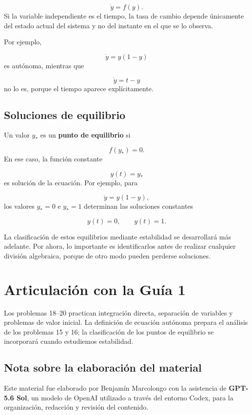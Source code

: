 \documentclass[12pt,a4paper]{article}
\begin{document}
	\[
	\dot y=f(y).
	\]
	Si la variable independiente es el tiempo, la tasa de cambio depende únicamente del estado actual del sistema y no del instante en el que se lo observa.

	Por ejemplo,

	\[
	\dot y=y(1-y)
	\]
	es autónoma, mientras que

	\[
	\dot y=t-y
	\]
	no lo es, porque el tiempo aparece explícitamente.

	\subsection{Soluciones de equilibrio}

	Un valor \(y_\ast\) es un \textbf{punto de equilibrio} si

	\[
	f(y_\ast)=0.
	\]
	En ese caso, la función constante

	\[
	y(t)=y_\ast
	\]
	es solución de la ecuación. Por ejemplo, para

	\[
	\dot y=y(1-y),
	\]
	los valores \(y_\ast=0\) e \(y_\ast=1\) determinan las soluciones constantes

	\[
	y(t)=0,
	\qquad
	y(t)=1.
	\]

	La clasificación de estos equilibrios mediante estabilidad se desarrollará más adelante. Por ahora, lo importante es identificarlos antes de realizar cualquier división algebraica, porque de otro modo pueden perderse soluciones.

	\clearpage
	\section*{Articulación con la Guía 1}

	Los problemas 18--20 practican integración directa, separación de variables y problemas de valor inicial. La definición de ecuación autónoma prepara el análisis de los problemas 15 y 16; la clasificación de los puntos de equilibrio se incorporará cuando estudiemos estabilidad.

	\subsection*{Nota sobre la elaboración del material}

	Este material fue elaborado por Benjamín Marcolongo con la asistencia de \textbf{GPT-5.6 Sol}, un modelo de OpenAI utilizado a través del entorno Codex, para la organización, redacción y revisión del contenido.
\end{document}
